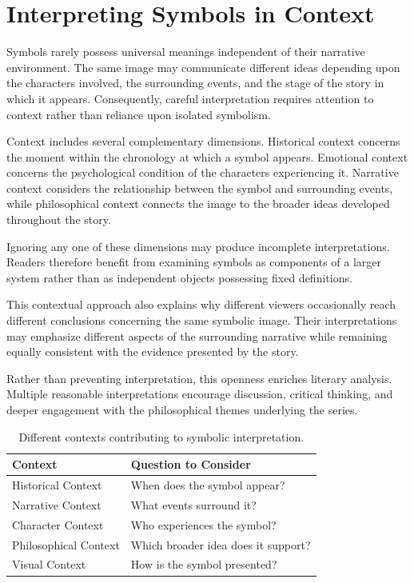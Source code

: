 \documentclass[12pt,oneside,openany]{book}
\begin{document}
\section{Interpreting Symbols in Context}

Symbols rarely possess universal meanings independent of their narrative
environment. The same image may communicate different ideas depending upon the
characters involved, the surrounding events, and the stage of the story in
which it appears. Consequently, careful interpretation requires attention to
context rather than reliance upon isolated symbolism.

Context includes several complementary dimensions. Historical context concerns
the moment within the chronology at which a symbol appears. Emotional context
concerns the psychological condition of the characters experiencing it.
Narrative context considers the relationship between the symbol and surrounding
events, while philosophical context connects the image to the broader ideas
developed throughout the story.

Ignoring any one of these dimensions may produce incomplete interpretations.
Readers therefore benefit from examining symbols as components of a larger
system rather than as independent objects possessing fixed definitions.

This contextual approach also explains why different viewers occasionally reach
different conclusions concerning the same symbolic image. Their interpretations
may emphasize different aspects of the surrounding narrative while remaining
equally consistent with the evidence presented by the story.

Rather than preventing interpretation, this openness enriches literary
analysis. Multiple reasonable interpretations encourage discussion, critical
thinking, and deeper engagement with the philosophical themes underlying the
series.

\begin{table}[H]
\centering
\begin{tabular}{|p{4.3cm}|p{7.7cm}|}
\hline
\textbf{Context} & \textbf{Question to Consider}\\
\hline
Historical Context & When does the symbol appear?\\
\hline
Narrative Context & What events surround it?\\
\hline
Character Context & Who experiences the symbol?\\
\hline
Philosophical Context & Which broader idea does it support?\\
\hline
Visual Context & How is the symbol presented?\\
\hline
\end{tabular}
\caption{Different contexts contributing to symbolic interpretation.}
\end{table}
\end{document}
